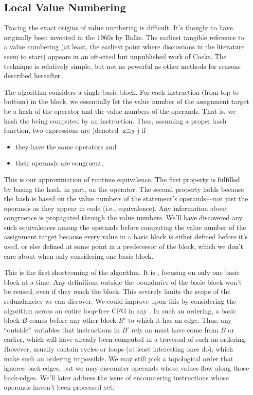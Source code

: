\subsection{Local Value Numbering}\label{sec:vn:local}

Tracing the exact origins of value numbering is difficult.  It's thought to
have originally been invented in the 1960s by Balke.  The
earliest tangible reference to a value numbering (at least, the earliest point
where discussions in the literature seem to start) appears in an oft-cited but
unpublished work of Cocke.  The technique is relatively simple,
but not as powerful as other methods for reasons described hereafter.

The algorithm considers a single basic block.  For each instruction (from top
to bottom) in the block, we essentially let the value number of the assignment
target be a hash of the operator and the value numbers of the operands.  That
is, we hash the  being computed by an instruction.  Thus,
assuming a proper hash function, two expressions are  (denoted
$\texttt{x} \cong \texttt{y}$) if
%
\begin{itemize}
%
  \item they have the same operators and
%
  \item their operands are congruent.
%
\end{itemize}
%
\noindent This is our approximation of runtime equivalence.  The first property
is fulfilled by basing the hash, in part, on the operator.  The second property
holds because the hash is based on the value numbers of the statement's
operands---not just the operands as they appear in code (i.e., 
equivalence).  Any information about congruence is propagated through the value
numbers.  We'll have discovered any such equivalences among the operands before
computing the value number of the assignment target because every value in a
basic block is either defined before it's used, or else defined at some point
in a predecessor of the block, which we don't care about when only considering
one basic block.

This is the first shortcoming of the algorithm.  It is , focusing
on only one basic block at a time.  Any definitions outside the boundaries of
the basic block won't be reused, even if they reach the block.  This severely
limits the scope of the redundancies we can discover.  We could improve upon
this by considering the algorithm across an entire loop-free \gls{CFG} in any
.  In such an ordering, a basic block $B$ comes before
any other block $B'$ to which it has an edge.  Thus, any ``outside'' variables
that instructions in $B'$ rely on must have come from $B$ or earlier, which
will have already been computed in a traversal of such an ordering.  However,
 usually contain cycles or loops (at least interesting ones do),
which make such an ordering impossible.  We may still pick a topological order
that ignores back-edges, but we may encounter operands whose values flow along
those back-edges.  We'll later address the issue of encountering instructions
whose operands haven't been processed yet.

